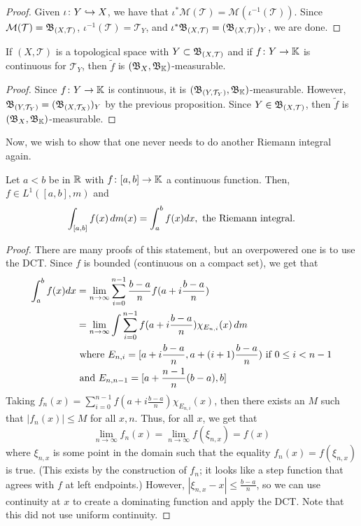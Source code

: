 \documentclass[11pt,leqno,oneside]{amsbook}
\numberwithin{thm}{section}
\newcommand{\M}{\mathcal{M}} %
\newcommand{\Top}{\mathcal{T}} %
\newcommand{\K}{\mathbb{K}} %
\begin{document}
\begin{proof}
    Given \(\iota \colon Y \hookrightarrow X\), we have that \(\iota^* \M(\Top) =
  \M(\iota^{-1}(\Top))\). Since \(\M(\Top) = \B_{(X,\Top)}\),
  \(\iota^{-1}(\Top) = \Top_Y\), and \(\iota^* \B_{(X,\Top)} =
  (\B_{(X,\Top)})_Y\), we are done.
\end{proof}
\begin{prop}
  If \((X,\Top)\) is a topological space with \(Y \subset
  \B_{(X,\Top)}\) and if \(f \from Y \to \K\) is continuous for
  \(\Top_Y\), then \(\tilde{f}\) is \((\B_X, \B_\K)\)-measurable.
\end{prop}
\begin{proof}
  Since \(f \from Y \to \K\) is continuous, it is \((\B_{(Y,\Top_Y)},
  \B_\K)\)-measurable. However, \(\B_{(Y,\Top_Y)} =
  (\B_{(X,\Top_X)})_Y\) by the previous proposition. Since \(Y \in
  \B_{(X,\Top)}\), then \(\tilde{f}\) is \((\B_X, \B_\K)\)-measurable.
\end{proof}
Now, we wish to show that one never needs to do another Riemann
integral again.
\begin{thm}
  Let \(a<b\) be in \({\mathbb R}\) with \(f \from [a,b] \to \K\) a continuous
  function. Then, \(f \in L^1([a,b],m)\) and \[
    \int_{[a,b]} f(x) \, d m(x) = \int_a^b f(x) dx, \text{ the Riemann integral.}
  \]
\end{thm}
\begin{proof}
  There are many proofs of this statement, but an overpowered one is
  to use the DCT. Since \(f\) is bounded (continuous on a compact
  set), we get that
  \begin{align*}
    \int_a^b f(x) dx & = \lim_{n \to \infty} \sum_{i=0}^{n-1}
                       \frac{b-a}{n} f(a + i \frac{b-a}{n}) \\
    & = \lim_{n \to \infty} \int \sum_{i=0}^{n-1} f(a+i\frac{b-a}{n})
      \chi_{E_{n,i}}(x) \, d m \\
    & \text{ where }  E_{n,i} = [a+i\frac{b-a}{n},a+(i+1)\frac{b-a}{n})
      \text{ if } 0 \leq i < n-1 \\
    & \text{ and } E_{n,n-1} = [a+\frac{n-1}{n}(b-a), b]
  \end{align*}
Taking \(f_n(x) = \sum_{i=0}^{n-1} f(a+i \frac{b-a}{n})
\chi_{E_{n,i}}(x)\), then there exists an \(M\) such that \(|f_n(x)|
\leq M\) for all \(x,n\). Thus, for all \(x\), we get that \[
  \lim_{n \to \infty} f_n(x) = \lim_{n \to \infty} f(\xi_{n,x}) = f(x)
\]
where \(\xi_{n,x}\) is some point in the domain such that the equality
\(f_n(x) = f(\xi_{n,x})\) is true. (This exists by the construction of
\(f_n\); it looks like a step function that agrees with \(f\) at left
endpoints.) However, \(|\xi_{n,x}-x| \leq \frac{b-a}{n}\), so we can
use continuity at \(x\) to create a dominating function and apply the
DCT. Note that this did not use uniform continuity.
\end{proof}
\end{document}
